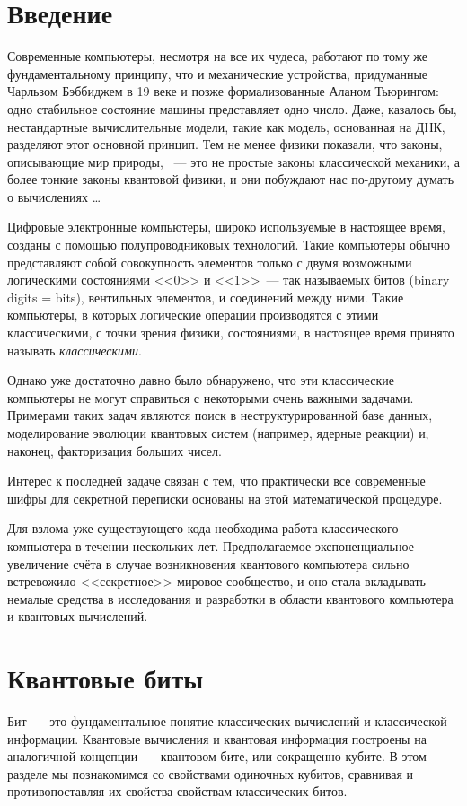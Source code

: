 \begin{multicols}{2}
    \section*{Введение}
    \normalsize{Современные компьютеры, несмотря на все их чудеса, работают по тому же фундаментальному принципу, что и механические устройства, придуманные Чарльзом Бэббиджем в 19 веке и позже формализованные Аланом Тьюрингом: одно стабильное состояние машины представляет одно число. Даже, казалось бы, нестандартные вычислительные модели, такие как модель, основанная на ДНК, разделяют этот основной принцип. Тем не менее физики показали, что законы, описывающие мир природы, ~--- это не простые законы классической механики, а более тонкие законы квантовой физики, и они побуждают нас по-другому думать о вычислениях \ldots
    
    Цифровые электронные компьютеры, широко используемые в настоящее время, созданы с помощью полупроводниковых технологий. Такие компьютеры обычно представляют собой совокупность элементов только с двумя возможными логическими состояниями <<0>> и <<1>>~--- так называемых битов (binary digits = bits), вентильных элементов, и соединений между ними. Такие компьютеры, в которых логические операции производятся с этими классическими, с точки зрения физики, состояниями, в настоящее время принято называть \emph{классическими}.

    Однако уже достаточно давно было обнаружено, что эти классические компьютеры не могут справиться с некоторыми очень важными задачами. Примерами таких задач являются поиск в неструктурированной базе данных, моделирование эволюции квантовых систем (например, ядерные реакции) и, наконец, факторизация больших чисел.

    Интерес к последней задаче связан с тем, что практически все современные шифры для секретной переписки основаны на этой математической процедуре.

    Для взлома уже существующего кода необходима работа классического компьютера в течении нескольких лет. Предполагаемое экспоненциальное увеличение счёта в случае возникновения квантового компьютера сильно встревожило <<секретное>> мировое сообщество, и оно стала вкладывать немалые средства в исследования и разработки в области квантового компьютера и квантовых вычислений.}
    \section*{Квантовые биты}
    \normalsize{Бит~--- это фундаментальное понятие классических вычислений и классической информации.
    Квантовые вычисления и квантовая информация построены на аналогичной концепции~---
    квантовом бите, или сокращенно кубите. В этом разделе мы познакомимся со свойствами одиночных
    кубитов, сравнивая и противопоставляя их свойства свойствам классических битов.
    
}
\end{multicols}
